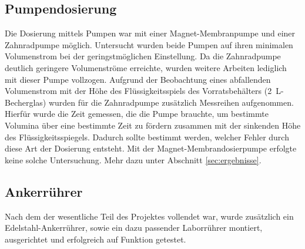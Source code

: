 \subsection{Pumpendosierung}
Die Dosierung mittels Pumpen war mit einer Magnet-Membranpumpe und einer Zahnradpumpe möglich. 
Untersucht wurden beide Pumpen auf ihren minimalen Volumenstrom bei der geringstmöglichen Einstellung. Da die Zahnradpumpe deutlich geringere Volumenströme erreichte, wurden weitere Arbeiten lediglich mit dieser Pumpe vollzogen. Aufgrund der Beobachtung eines abfallenden Volumenstrom mit der Höhe des Flüssigkeitsspiels des Vorratsbehälters (\SI{2}{\liter}-Becherglas) wurden für die Zahnradpumpe zusätzlich Messreihen aufgenommen. Hierfür wurde die Zeit gemessen, die die Pumpe brauchte, um bestimmte Volumina über eine bestimmte Zeit zu fördern zusammen mit der sinkenden Höhe des Flüssigkeitsspiegels. Dadurch sollte bestimmt werden, welcher Fehler durch diese Art der Dosierung entsteht. Mit der Magnet-Membrandosierpumpe erfolgte keine solche Untersuchung. Mehr dazu unter Abschnitt \ref{sec:ergebnisse}.
\vspace*{-3mm}
\subsection{Ankerrührer}
Nach dem der wesentliche Teil des Projektes vollendet war, wurde zusätzlich ein Edelstahl-Ankerrührer, sowie ein dazu passender Laborrührer montiert, ausgerichtet und erfolgreich auf Funktion getestet.
